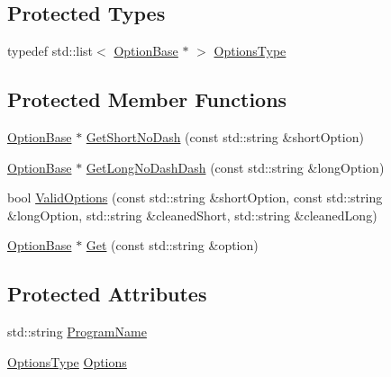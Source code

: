 \subsection*{Protected Types}
\begin{DoxyCompactItemize}
\item 
typedef std\+::list$<$ \hyperlink{classcmn_command_line_options_1_1_option_base}{Option\+Base} $\ast$ $>$ \hyperlink{classcmn_command_line_options_a421232856a8c450024b205ed8a4c4c7d}{Options\+Type}
\end{DoxyCompactItemize}
\subsection*{Protected Member Functions}
\begin{DoxyCompactItemize}
\item 
\hyperlink{classcmn_command_line_options_1_1_option_base}{Option\+Base} $\ast$ \hyperlink{classcmn_command_line_options_a9654862a446aff3bdfeef119ff9447f5}{Get\+Short\+No\+Dash} (const std\+::string \&short\+Option)
\item 
\hyperlink{classcmn_command_line_options_1_1_option_base}{Option\+Base} $\ast$ \hyperlink{classcmn_command_line_options_ae31b7a96cd760eacaa1f0f32e158573d}{Get\+Long\+No\+Dash\+Dash} (const std\+::string \&long\+Option)
\item 
bool \hyperlink{classcmn_command_line_options_ad19b7c1fa18e247d5444595526a228a8}{Valid\+Options} (const std\+::string \&short\+Option, const std\+::string \&long\+Option, std\+::string \&cleaned\+Short, std\+::string \&cleaned\+Long)
\item 
\hyperlink{classcmn_command_line_options_1_1_option_base}{Option\+Base} $\ast$ \hyperlink{classcmn_command_line_options_a5cb0df17d19e8de595bd9a5c1b9afb38}{Get} (const std\+::string \&option)
\end{DoxyCompactItemize}
\subsection*{Protected Attributes}
\begin{DoxyCompactItemize}
\item 
std\+::string \hyperlink{classcmn_command_line_options_a3bd5b3dce4d3b8b3f9010d387513f8cb}{Program\+Name}
\item 
\hyperlink{classcmn_command_line_options_a421232856a8c450024b205ed8a4c4c7d}{Options\+Type} \hyperlink{classcmn_command_line_options_a921f64221c35be2f04cb23d5d2a2952f}{Options}
\end{DoxyCompactItemize}


